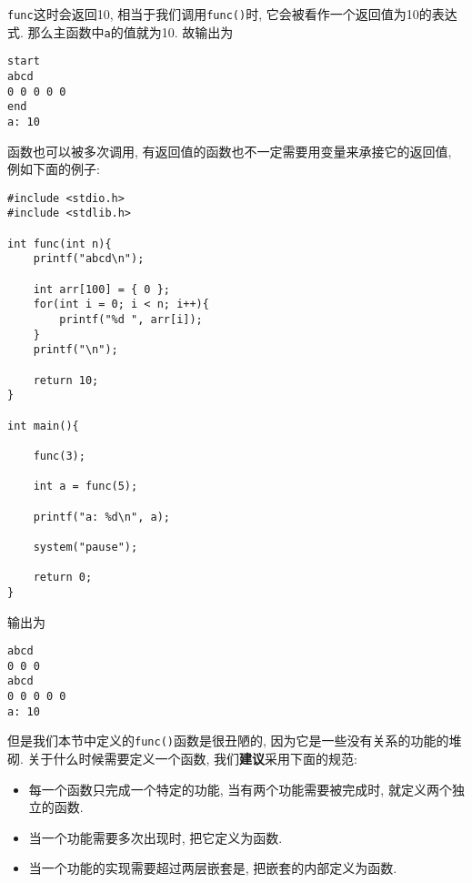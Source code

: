         \texttt{func}这时会返回10, 相当于我们调用\texttt{func()}时, 它会被看作一个返回值为10的表达式. 那么主函数中\texttt{a}的值就为10. 故输出为
\begin{lstlisting}
start
abcd
0 0 0 0 0
end
a: 10
\end{lstlisting}

        函数也可以被多次调用, 有返回值的函数也不一定需要用变量来承接它的返回值, 例如下面的例子:
\begin{lstlisting}
#include <stdio.h>
#include <stdlib.h>

int func(int n){
    printf("abcd\n");

    int arr[100] = { 0 };
    for(int i = 0; i < n; i++){
        printf("%d ", arr[i]);
    }
    printf("\n");

    return 10;
}

int main(){

    func(3);

    int a = func(5);

    printf("a: %d\n", a);

    system("pause");

    return 0;
}
\end{lstlisting}

        输出为
\begin{lstlisting}
abcd
0 0 0
abcd
0 0 0 0 0
a: 10
\end{lstlisting}

        但是我们本节中定义的\texttt{func()}函数是很丑陋的, 因为它是一些没有关系的功能的堆砌. 关于什么时候需要定义一个函数, 我们\textbf{建议}采用下面的规范:
        \begin{itemize}
            \item 每一个函数只完成一个特定的功能, 当有两个功能需要被完成时, 就定义两个独立的函数.
            \item 当一个功能需要多次出现时, 把它定义为函数.
            \item 当一个功能的实现需要超过两层嵌套是, 把嵌套的内部定义为函数.
        \end{itemize}

